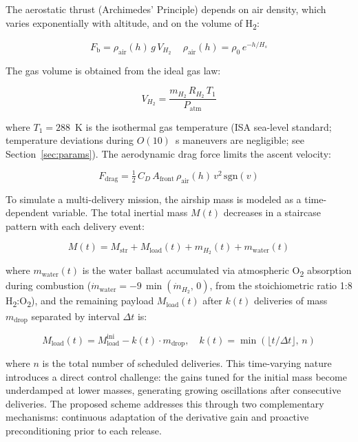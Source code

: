 \documentclass[applsci,article,submit,pdftex,moreauthors]{Definitions/mdpi}
\newcommand{\dotmH}{\dot{m}_{H_2}}
\begin{document}
The aerostatic thrust (Archimedes' Principle) depends on air density, which varies exponentially with altitude, and on the volume of H\textsubscript{2}:

\begin{equation}
F_\text{b} = \rho_\text{air}(h)\,g\,V_{H_2}\, \quad
\rho_\text{air}(h) = \rho_0\,e^{-h/H_s}
\label{eq:arquimedes}
\end{equation}

The gas volume is obtained from the ideal gas law:

\begin{equation}
V_{H_2} = \frac{m_{H_2}\,R_{H_2}\,T_1}{P_\text{atm}}
\label{eq:gas_ideal}
\end{equation}

where $T_1 = 288$~K is the isothermal gas temperature (ISA sea-level standard; temperature deviations during $O(10)$~s maneuvers are negligible; see Section~\ref{sec:params}). The aerodynamic drag force limits the ascent velocity:

\begin{equation}
F_\text{drag} = \tfrac{1}{2}\,C_D\,A_\text{front}\,\rho_\text{air}(h)\,v^2\,\mathrm{sgn}(v)
\label{eq:arrastre}
\end{equation}

To simulate a multi-delivery mission, the airship mass is modeled as a time-dependent variable. The total inertial mass $M(t)$ decreases in a staircase pattern with each delivery event:

\begin{equation}
M(t) = M_\text{str} + M_\text{load}(t) + m_{H_2}(t) + m_\text{water}(t)
\end{equation}

where $m_\text{water}(t)$ is the water ballast accumulated via atmospheric O\textsubscript{2} absorption during combustion ($\dot{m}_\text{water} = -9\,\min(\dotmH,\,0)$, from the stoichiometric ratio 1:8 H\textsubscript{2}:O\textsubscript{2}), and the remaining payload $M_\text{load}(t)$ after $k(t)$ deliveries of mass $m_\text{drop}$ separated by interval $\Delta t$ is:

\begin{equation}
M_\text{load}(t) = M_\text{load}^\text{ini} - k(t) \cdot m_\text{drop}, \quad k(t) = \min\left(\lfloor t / \Delta t \rfloor,\, n\right)
\end{equation}

where $n$ is the total number of scheduled deliveries. This time-varying nature introduces a direct control challenge: the gains tuned for the initial mass become underdamped at lower masses, generating growing oscillations after consecutive deliveries. The proposed scheme addresses this through two complementary mechanisms: continuous adaptation of the derivative gain and proactive preconditioning prior to each release.
\end{document}
